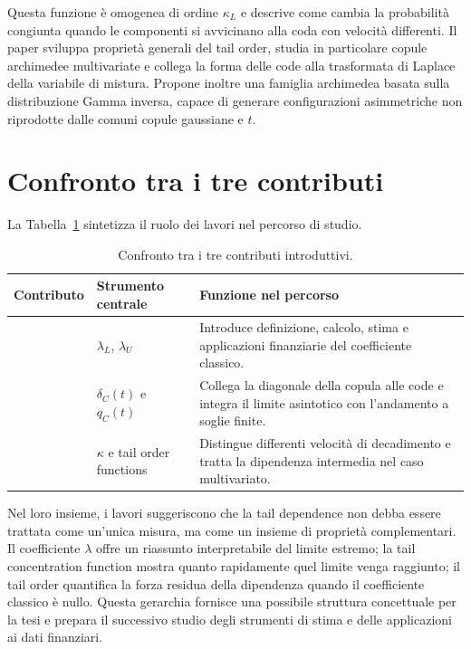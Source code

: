 Questa funzione è omogenea di ordine $\kappa_L$ e descrive come cambia la
probabilità congiunta quando le componenti si avvicinano alla coda con
velocità differenti. Il paper sviluppa proprietà generali del tail order,
studia in particolare copule archimedee multivariate e collega la forma delle
code alla trasformata di Laplace della variabile di mistura. Propone inoltre
una famiglia archimedea basata sulla distribuzione Gamma inversa, capace di
generare configurazioni asimmetriche non riprodotte dalle comuni copule
gaussiane e $t$.

\section{Confronto tra i tre contributi}

La Tabella~\ref{tab:confronto-paper} sintetizza il ruolo dei lavori nel
percorso di studio.

\begin{table}[htbp]
    \centering
    \caption{Confronto tra i tre contributi introduttivi.}
    \label{tab:confronto-paper}
    \begin{tabularx}{\textwidth}{%
        >{\raggedright\arraybackslash}p{}%
        >{\raggedright\arraybackslash}p{}%
        >{\raggedright\arraybackslash}X}
        \toprule
        Contributo & Strumento centrale & Funzione nel percorso \\
        \midrule
        \textcite{schmidt2005}
        & $\lambda_L$, $\lambda_U$
        & Introduce definizione, calcolo, stima e applicazioni finanziarie del
          coefficiente classico. \\
        \addlinespace
        \textcite{duranteEtAl2015}
        & $\delta_C(t)$ e $q_C(t)$
        & Collega la diagonale della copula alle code e integra il limite
          asintotico con l'andamento a soglie finite. \\
        \addlinespace
        \textcite{huaJoe2011}
        & $\kappa$ e tail order functions
        & Distingue differenti velocità di decadimento e tratta la dipendenza
          intermedia nel caso multivariato. \\
        \bottomrule
    \end{tabularx}
\end{table}

Nel loro insieme, i lavori suggeriscono che la tail dependence non debba
essere trattata come un'unica misura, ma come un insieme di proprietà
complementari. Il coefficiente $\lambda$ offre un riassunto interpretabile del
limite estremo; la tail concentration function mostra quanto rapidamente quel
limite venga raggiunto; il tail order quantifica la forza residua della
dipendenza quando il coefficiente classico è nullo. Questa gerarchia fornisce
una possibile struttura concettuale per la tesi e prepara il successivo studio
degli strumenti di stima e delle applicazioni ai dati finanziari.

